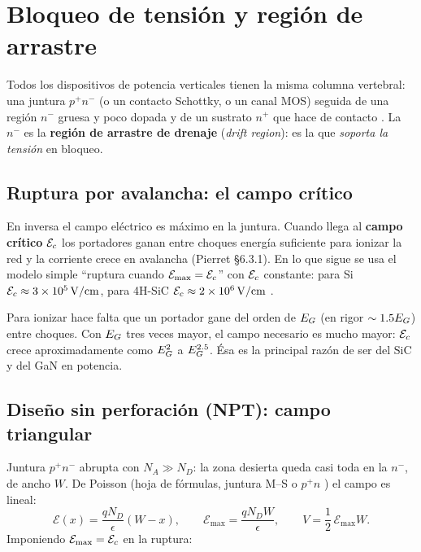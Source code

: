 \section{Bloqueo de tensión y región de arrastre}
\label{sec:deriva}

Todos los dispositivos de potencia verticales tienen la misma columna vertebral: una juntura
$p^+n^-$ (o un contacto Schottky, o un canal MOS) seguida de una región $n^-$ gruesa y poco dopada y
de un sustrato $n^+$ que hace de contacto . La $n^-$ es la \textbf{región de arrastre
de drenaje} (\emph{drift region}): es la que \emph{soporta la tensión} en bloqueo.

\subsection{Ruptura por avalancha: el campo crítico}

En inversa el campo eléctrico es máximo en la juntura. Cuando llega al \textbf{campo crítico}
$\mathcal{E}_c$ los portadores ganan entre choques energía suficiente para ionizar la red y la corriente
crece en avalancha (Pierret §6.3.1). En lo que sigue se usa el modelo simple ``ruptura cuando
$\mathcal{E}_{\max}=\mathcal{E}_c$'' con $\mathcal{E}_c$ constante: para Si $\mathcal{E}_c\approx\SI{3e5}{V/cm}$, para 4H-SiC
$\mathcal{E}_c\approx\SI{2e6}{V/cm}$ .

\begin{intuicion}
Para ionizar hace falta que un portador gane del orden de $E_G$ (en rigor $\sim1.5E_G$) entre choques.
Con $E_G$ tres veces mayor, el campo necesario es mucho mayor: $\mathcal{E}_c$ crece aproximadamente como
$E_G^{2}$ a $E_G^{2.5}$. Ésa es la principal razón de ser del SiC y del GaN en potencia.
\end{intuicion}

\subsection{Diseño sin perforación (NPT): campo triangular}

Juntura $p^+n^-$ abrupta con $N_A\gg N_D$: la zona desierta queda casi toda en la $n^-$, de ancho
$W$. De Poisson (hoja de fórmulas, juntura M--S o $p^+n$ \enhojatexto) el campo es lineal:
\[
  \mathcal{E}(x)=\frac{qN_D}{\epsilon}(W-x),\qquad \mathcal{E}_{\max}=\frac{qN_DW}{\epsilon},
  \qquad V=\frac12\,\mathcal{E}_{\max}W .
\]
Imponiendo $\mathcal{E}_{\max}=\mathcal{E}_c$ en la ruptura:

